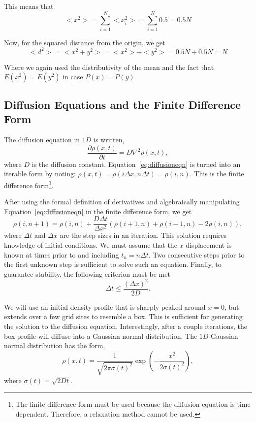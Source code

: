 \documentclass[12pt]{article}
\begin{document}
This means that 
\begin{equation}
    <x^2>=\sum_{i=1}^N <x_i^2>=\sum_{i=1}^N 0.5=0.5N
\end{equation}

Now, for the squared distance from the origin, we get
\begin{equation}
    <d^2>=<x^2+y^2>=<x^2>+<y^2>=0.5N+0.5N=N
\end{equation}

Where we again used the distributivity of the mean and the fact that $E(x^2)=E(y^2)$ in case $P(x)=P(y)$

\subsection{Diffusion Equations and the Finite Difference Form}
\label{sec:diffusionequation}
The diffusion equation in $1D$ is written,
\begin{equation}
  \label{eq:diffusioneqn}
  \frac{\partial\rho(x,t)}{\partial t} = D\nabla^2\rho(x,t),
\end{equation}
where $D$ is the diffusion constant. Equation~\ref{eq:diffusioneqn} is turned into an iterable form by noting: $\rho(x,t) = \rho(i\Delta x, n\Delta t) = \rho(i,n)$. This is the finite difference form\footnote{The finite difference form must be used because the diffusion equation is time dependent. Therefore, a relaxation method cannot be used.}.

After using the formal definition of derivatives and algebraically manipulating Equation~\ref{eq:diffusioneqn} in the finite difference form, we get
\begin{equation}
  \label{eq:diffusioneqn-iterable}
  \rho(i,n+1) = \rho(i,n) + \frac{D\Delta t}{\Delta x^2}\left(\rho(i+1,n) + \rho(i-1,n) - 2\rho(i,n)\right),
\end{equation}
where $\Delta t$ and $\Delta x$ are the step sizes in an iteration. This solution requires knowledge of initial conditions. We must assume that the $x$ displacement is known at times prior to and including $t_n = n\Delta t$. Two consecutive steps prior to the first unknown step is sufficient to solve such an equation. Finally, to guarantee stability, the following criterion must be met
\begin{equation}
  \label{eq:stabilitycriterion}
  \Delta t \leq \frac{(\Delta x)^2}{2D}.
\end{equation}

We will use an initial density profile that is sharply peaked around $x=0$, but extends over a few grid sites to resemble a box. This is sufficient for generating the solution to the diffusion equation. Interestingly, after a couple iterations, the box profile will diffuse into a Gaussian normal distribution. The $1D$ Gaussian normal distribution has the form,
\begin{equation}
  \label{eq:gaussiandistribution}
  \rho(x,t) = \frac{1}{\sqrt{2\pi\sigma(t)^2}}\exp\left(-\frac{x^2}{2\sigma(t)^2}\right),
\end{equation}
where $\sigma(t) = \sqrt{2Dt}$.
\end{document}
